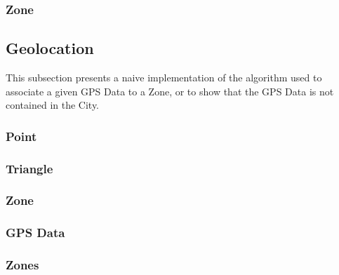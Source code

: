 \subsubsection{Zone}

\subsection{Geolocation}
This subsection presents a naive implementation of the algorithm used to associate a given GPS Data to a Zone, or to show that the GPS Data is not contained in the City.
\subsubsection{Point}
\subsubsection{Triangle}
\subsubsection{Zone}
\subsubsection{GPS Data}
\subsubsection{Zones}
